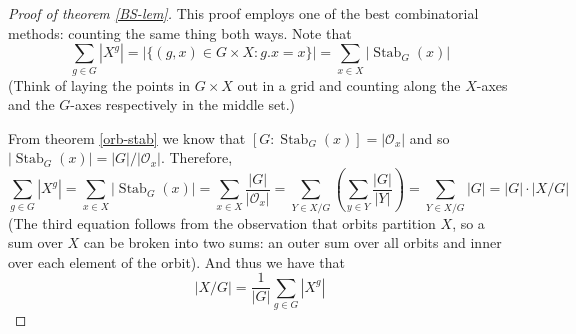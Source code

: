 \documentclass[12pt]{article}
\numberwithin{equation}{subsection}
\theoremstyle{note}
\newcommand{\Stab}{\operatorname{Stab}}
\begin{document}
\begin{proof}[Proof of theorem \ref{BS-lem}]
	This proof employs one of the best combinatorial methods: counting the same thing both ways. Note that \[ \sum_{g\in G} |X^g|= \left|\{ (g,x)\in G\times X : g.x=x\} \right|= \sum_{x\in X} |\Stab_G(x)|\] (Think of laying the points in $G\times X$ out in a grid and counting along the $X$-axes and the $G$-axes respectively in the middle set.)
	
	From theorem \ref{orb-stab} we know that $[G: \Stab_G(x)]=|\mathcal{O}_x|$ and so $|\Stab_G(x)|=|G|/ |\mathcal{O}_x|$. Therefore,\[ \sum_{g\in G} |X^g|= \sum_{x\in X} |\Stab_G(x)|=\sum_{x\in X}\dfrac{|G|}{|\mathcal{O}_x|}=\sum_{Y\in X/G} \left(\sum_{y\in Y} \dfrac{|G|}{|Y|}\right)=\sum_{Y\in X/G}|G|=|G|\cdot|X/G|\]
	(The third equation follows from the observation that orbits partition $X$, so a sum over $X$ can be broken into two sums: an outer sum over all orbits and inner over each element of the orbit). And thus we have that \[ |X/G|=\dfrac{1}{|G|} \sum_{g\in G} |X^g|\]
\end{proof}
\end{document}
